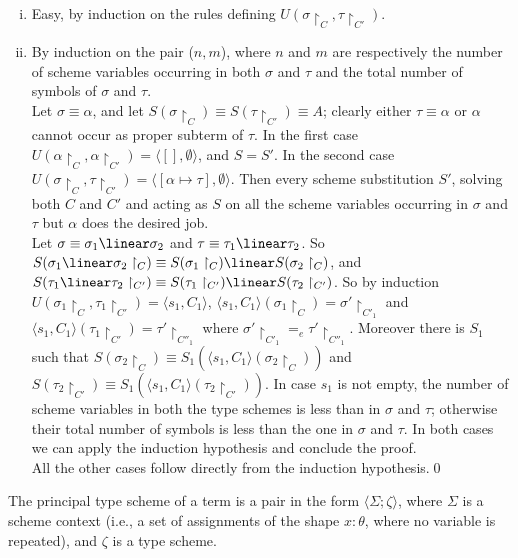 \proof\hfill
\begin{enumerate}[i)]
\item Easy, by induction on the rules defining $U(\sigma\restriction_{C}, \tau\restriction_{C'})$.
\item By induction on the pair ($n,m$), where $n$ and $m$ are respectively the number of scheme variables occurring in
both $\sigma$ and $\tau$ and the total number of symbols of $\sigma$ and $\tau$.\\
Let $\sigma \equiv \alpha$, and let $S(\sigma\restriction_{C})\equiv S(\tau\restriction_{C'})\equiv A$; clearly 
either $\tau \equiv \alpha$ or $\alpha$ cannot occur as proper subterm of $\tau$. 
In the first case $U(\alpha\restriction_{C},\alpha\restriction_{C'})=\langle [], \emptyset\rangle $, and
$S =S'$. In the second case
$U(\sigma\restriction_{C},\tau\restriction_{C'})=\langle [\alpha \mapsto \tau], \emptyset\rangle $. Then every 
scheme substitution $S'$, solving both $C$ and $C'$ and acting as $S$ on all the scheme 
variables occurring in $\sigma$ and $\tau$ but $\alpha$
does the desired job.\\
Let $\sigma \equiv \sigma_{1}\linear \sigma_{2}$ and $\tau \equiv \tau_{1}\linear \tau_{2}$.
So $S(\sigma_{1}\linear \sigma_{2}\restriction_{C})\equiv S(\sigma_{1}\restriction_{C})\linear S(\sigma_{2}\restriction_{C})$,
and $S(\tau_{1}\linear \tau_{2}\restriction_{C'})\equiv S(\tau_{1}\restriction_{C'})\linear S(\tau_{2}\restriction_{C'})$.
So by induction 
$U(\sigma_{1}\restriction_{C},\tau_{1}\restriction_{C'})=\langle s_{1}, C_{1}\rangle $,
$\langle s_{1}, C_{1}\rangle (\sigma_{1}\restriction_{C})= \sigma'\restriction _{C'_{1}}$
and $\langle s_{1}, C_{1}\rangle (\tau_{1}\restriction_{C'})= \tau'\restriction _{C''_{1}}$
where $\sigma'\restriction _{C'_{1}}=_{e}\tau'\restriction _{C''_{1}}$. 
Moreover there is $S_{1}$
such that $S(\sigma_{2}\restriction_{C}) \equiv S_{1}(\langle s_{1}, C_{1}\rangle
(\sigma_{2}\restriction _{C}))$ and
$S(\tau_{2}\restriction_{C'})\equiv S_{1}(\langle s_{1}, C_{1}\rangle
(\tau_{2}\restriction_{C'}))$.
In case $s_{1}$ is not empty, the number 
of scheme variables in both the type schemes is less than
in $\sigma $ and $\tau$; otherwise their total number of symbols is less than the one in 
$\sigma$ and $\tau$.
In both cases we can apply the induction hypothesis and conclude the proof.\\
All the other cases follow directly from the induction hypothesis.\qed
\end{enumerate}

The principal type scheme of a term is a pair in the form
$\langle\Sigma;\zeta\rangle$, where $\Sigma$ is a scheme context (i.e., a set of assignments
of the shape $x:\theta$, where no variable is repeated), and $\zeta$ is a
type scheme. 

